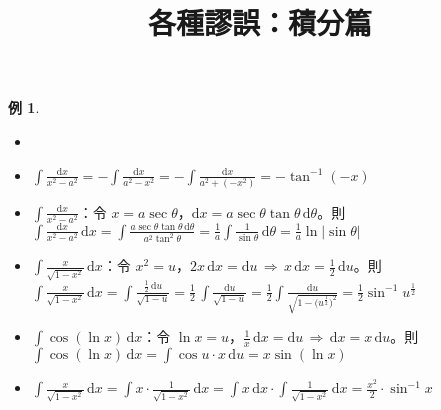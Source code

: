 \documentclass[12pt]{extarticle}
\newcommand{\ds}{\displaystyle}
\newcommand{\ie}{\,\Longrightarrow\,}
\theoremstyle{definition}
\newtheorem*{ex}{例}
\begin{document}
\title{\texorpdfstring{\vspace{-15mm}各種謬誤：積分篇}{各種謬誤：積分篇}} 
\author{\vspace{-4em}}
\date{\vspace{-4em}}

\maketitle

\begin{ex}
  \begin{itemize}
    \item[]
    \item $\ds\int\frac{\text{d}x}{x^2 - a^2} = -\int\frac{\text{d}x}{a^2 - x^2} = -\int\frac{\text{d}x}{a^2 + (-x^2)} = -\tan^{-1}(-x)$
    \item $\ds\int\frac{\text{d}x}{x^2 - a^2}$：令 $\ds x = a\sec\theta$，$\ds\text{d}x = a\sec\theta\tan\theta\,\text{d}\theta$。則 $\ds\int\frac{\text{d}x}{x^2 - a^2}\,\text{d}x = \int\frac{a\sec\theta\tan\theta\,\text{d}\theta}{a^2\tan^2\theta} = \frac{1}{a}\int\frac{1}{\sin\theta}\,\text{d}\theta = \frac{1}{a}\ln|\sin\theta|$
    \item $\ds\int\frac{x}{\sqrt{1 - x^2}}\,\text{d}x$：令 $\ds x^2 = u$，$\ds 2x\,\text{d}x = \text{d}u\ie x\,\text{d}x = \frac{1}{2}\,\text{d}u$。則 $\ds\int\frac{x}{\sqrt{1 - x^2}}\,\text{d}x = \int\frac{\frac{1}{2}\,\text{d}u}{\sqrt{1 - u}} = \frac{1}{2}\,\int\frac{\text{d}u}{\sqrt{1 - u}} = \frac{1}{2}\int\frac{\text{d}u}{\sqrt{1 - \big(u^{\frac{1}{2}}\big)^2}} = \frac{1}{2}\sin^{-1}u^{\frac{1}{2}}$
    \item $\ds\int\cos(\ln x)\,\text{d}x$：令 $\ds\ln x = u$，$\ds\frac{1}{x}\,\text{d}x = \text{d}u\ie \text{d}x = x\,\text{d}u$。則 $\ds\int\cos(\ln x)\,\text{d}x = \int\cos u\cdot x\,\text{d}u = x\sin(\ln x)$ 
    \item $\ds\int\frac{x}{\sqrt{1 - x^2}}\,\text{d}x = \int x\cdot\frac{1}{\sqrt{1 - x^2}}\,\text{d}x = \int x\,\text{d}x\cdot\int\frac{1}{\sqrt{1 - x^2}}\,\text{d}x = \frac{x^2}{2}\cdot\sin^{-1}{x}$
  \end{itemize}
\end{ex}
\end{document}
